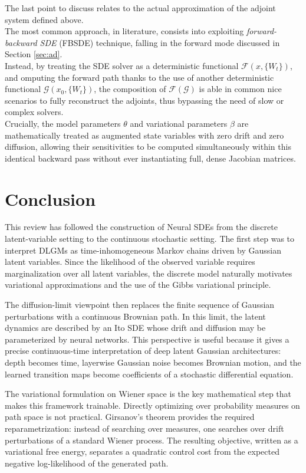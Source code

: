 \documentclass[11pt]{article}
\begin{document}
The last point to discuss relates to the actual approximation of the adjoint system defined above. \\ 
The most common approach, in literature, consists into exploiting \textit{forward-backward SDE} (FBSDE) technique, falling in the forward mode discussed in Section \ref{sec:ad}. \\ 
Instead, by treating the SDE solver as a deterministic functional $\mathcal{F}(x, \{W_t\})$, and omputing the forward path thanks to the use of another deterministic functional $\mathcal{G}(x_0, \{W_t\})$, the composition of $\mathcal{F}(\mathcal{G})$ is able in common nice scenarios to fully reconstruct the adjoints, thus bypassing the need of slow or complex solvers. \\ 
Crucially, the model parameters $\theta$ and variational parameters $\beta$ are mathematically treated as augmented state variables with zero drift and zero diffusion, allowing their sensitivities to be computed simultaneously within this identical backward pass without ever instantiating full, dense Jacobian matrices.



\section{Conclusion}
\label{sec:conclusion}
This review has followed the construction of Neural SDEs from the discrete latent-variable setting to the continuous stochastic setting. The first step was to interpret DLGMs as time-inhomogeneous Markov chains driven by Gaussian latent variables. Since the likelihood of the observed variable requires marginalization over all latent variables, the discrete model naturally motivates variational approximations and the use of the Gibbs variational principle.

The diffusion-limit viewpoint then replaces the finite sequence of Gaussian perturbations with a continuous Brownian path. In this limit, the latent dynamics are described by an Ito SDE whose drift and diffusion may be parameterized by neural networks. This perspective is useful because it gives a precise continuous-time interpretation of deep latent Gaussian architectures: depth becomes time, layerwise Gaussian noise becomes Brownian motion, and the learned transition maps become coefficients of a stochastic differential equation.

The variational formulation on Wiener space is the key mathematical step that makes this framework trainable. Directly optimizing over probability measures on path space is not practical. Girsanov's theorem provides the required reparametrization: instead of searching over measures, one searches over drift perturbations of a standard Wiener process. The resulting objective, written as a variational free energy, separates a quadratic control cost from the expected negative log-likelihood of the generated path.
\end{document}
